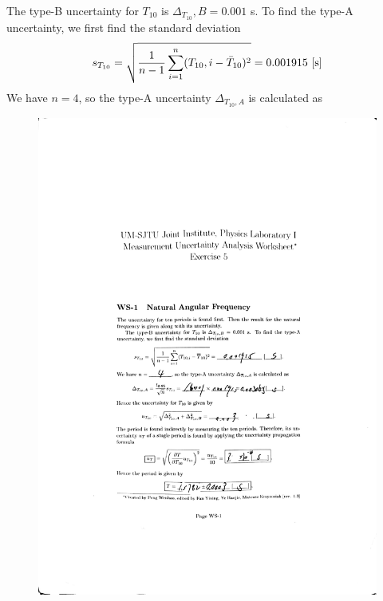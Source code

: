 \documentclass[a4paper]{report}
\begin{document}
	The type-B uncertainty for $T_10$ is $\Delta_{T_{10}},B=0.001$ s. To find the type-A uncertainty, we first find the standard deviation
	\begin{equation*}
	s_{T_{10}}=\sqrt{\dfrac{1}{n-1}\sum_{i=1}^n(T_{10},i-{\bar{T}_{10}})^2}=0.001915\ [\rm{s}]
	\end{equation*}
	We have $n=4$, so the type-A uncertainty $\Delta_{T_{10},A}$ is calculated as \fi
	\begin{figure}[H]
		\centering
		\includegraphics[width=1\linewidth]{6.jpg}
	\end{figure}
\end{document}
